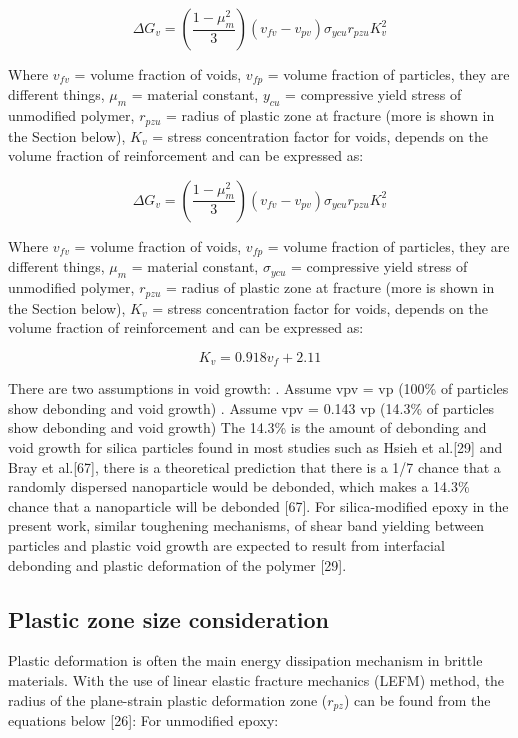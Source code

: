 \documentclass[numbers=noendperiod,chapterprefix=on]{icldt} %
\begin{document}
\begin{equation} 
\Delta G_v=\left( \frac{1-\mu_m^2}{3}\right) 
\left( v_{fv}-v_{pv}\right) 
\sigma_{ycu} r_{pzu} K_v^2
\end{equation}

Where $v_{fv}$ = volume fraction of voids, $v_{fp}$ = volume fraction of particles, they are different things, $\mu_m$ = material constant, $y_{cu}$ = compressive yield stress of unmodified polymer, $r_{pzu}$ = radius of plastic zone at fracture (more is shown in the Section below), $K_v$ = stress concentration factor for voids, depends on the volume fraction of reinforcement and can be expressed as:

\begin{equation} 
\Delta G_v=\left( \frac{1-\mu_m^2}{3}\right) 
(v_{fv}-v_{pv}
)\sigma_{ycu} r_{pzu} K_v^2
\end{equation}

Where $v_{fv}$ = volume fraction of voids, $v_{fp}$ = volume fraction of particles, they are different things, $\mu _m$ = material constant, $\sigma_{ycu}$ = compressive yield stress of unmodified polymer, $r_{pzu}$ = radius of plastic zone at fracture (more is shown in the Section below), $K_v$ = stress concentration factor for voids, depends on the volume fraction of reinforcement and can be expressed as:

\begin{equation} 
K_v=0.918v_f+2.11
\end{equation}

There are two assumptions in void growth:
.	Assume vpv = vp (100\% of particles show debonding and void growth) 
.	Assume vpv = 0.143 vp (14.3\% of particles show debonding and void growth)
\newline
The 14.3\% is the amount of debonding and void growth for silica particles found in most studies such as Hsieh et al.[29] and Bray et al.[67], there is a theoretical prediction that there is a 1/7 chance that a randomly dispersed nanoparticle would be debonded, which makes a 14.3\% chance that a nanoparticle will be debonded [67].
For silica-modified epoxy in the present work, similar toughening mechanisms, of shear band yielding between particles and plastic void growth are expected to result from interfacial debonding and plastic deformation of the polymer [29]. 

\subsection{Plastic zone size consideration }
Plastic deformation is often the main energy dissipation mechanism in brittle materials. With the use of linear elastic fracture mechanics (LEFM) method, the radius of the plane-strain plastic deformation zone ($r_{pz}$) can be found from the equations below [26]:
For unmodified epoxy: 
\end{document}
